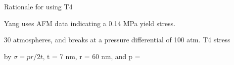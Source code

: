 
Rationale for using T4


Yang uses AFM data indicating a 0.14 MPa yield stress.

\cite{Osmotic2003} 30 atmospheres, and breaks at a pressure differential of 100 atm.
T4 stress

by $\sigma = pr / 2t $,
t = 7 nm, r = 60 nm, and p =
